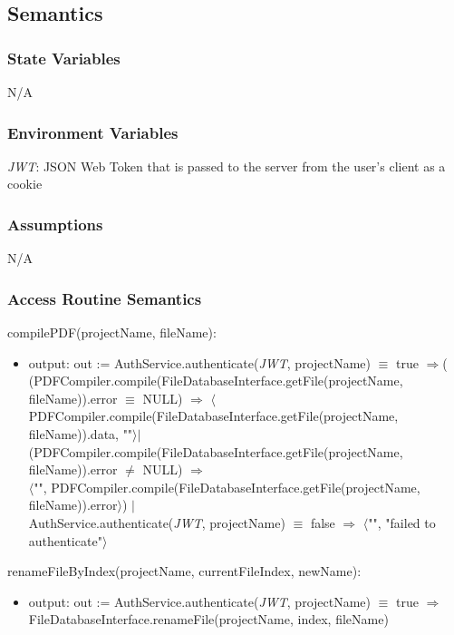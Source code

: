 \documentclass[12pt, titlepage]{article}
\begin{document}
	
	\subsection{Semantics}
	
	\subsubsection{State Variables}
	
	N/A
	
	\subsubsection{Environment Variables}
	
	\textit{JWT}: JSON Web Token that is passed to the server from the user's client as a cookie
	
	\subsubsection{Assumptions}
	
	N/A
	
	\subsubsection{Access Routine Semantics}
	
	\noindent compilePDF(projectName, fileName):
	\begin{itemize}
		
		\item output: out :=
		AuthService.authenticate(\textit{JWT}, projectName) $\equiv$ true $\Rightarrow$(
		(PDFCompiler.compile(FileDatabaseInterface.getFile(projectName, fileName)).error $\equiv$ NULL) $\Rightarrow$
		$\langle$\\PDFCompiler.compile(FileDatabaseInterface.getFile(projectName, fileName)).data, ""$\rangle |$\\
		(PDFCompiler.compile(FileDatabaseInterface.getFile(projectName, fileName)).error $\neq$ NULL) $\Rightarrow$\\
		$\langle$"", PDFCompiler.compile(FileDatabaseInterface.getFile(projectName, fileName)).error$\rangle$) $|$\\
		AuthService.authenticate(\textit{JWT}, projectName) $\equiv$ false $\Rightarrow$ $\langle$"", "failed to authenticate"$\rangle$
		
	\end{itemize}
	
	\noindent renameFileByIndex(projectName, currentFileIndex, newName):
	\begin{itemize}
		
		\item output: out :=
		AuthService.authenticate(\textit{JWT}, projectName) $\equiv$ true $\Rightarrow$ \\ FileDatabaseInterface.renameFile(projectName, index, fileName)
		
	\end{itemize}
	
\end{document}
